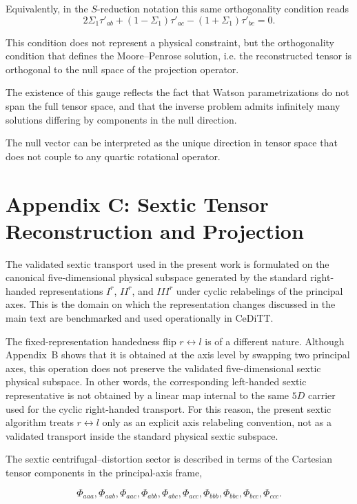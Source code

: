 \documentclass[aip,jcp,reprint,floatfix]{revtex4-2}
\begin{document}
Equivalently, in the $S$-reduction notation this same orthogonality
condition reads
\begin{equation}
2\Sigma_1\tau'_{ab}+(1-\Sigma_1)\tau'_{ac}-(1+\Sigma_1)\tau'_{bc}=0.
\end{equation}

This condition does not represent a physical constraint, but the
orthogonality condition that defines the Moore–Penrose solution,
i.e. the reconstructed tensor is orthogonal to the null space of the
projection operator.

The existence of this gauge reflects the fact that Watson
parametrizations do not span the full tensor space, and that the
inverse problem admits infinitely many solutions differing by
components in the null direction.

The null vector can be interpreted as the unique direction in tensor
space that does not couple to any quartic rotational operator.


\section{Appendix C: Sextic Tensor Reconstruction and Projection}

The validated sextic transport used in the present work is formulated
on the canonical five-dimensional physical subspace generated by the
standard right-handed representations $I^r$, $II^r$, and $III^r$ under
cyclic relabelings of the principal axes. This is the domain on which
the representation changes discussed in the main text are benchmarked
and used operationally in CeDiTT.

The fixed-representation handedness flip $r \leftrightarrow l$ is of a
different nature. Although Appendix~B shows that it is obtained at the
axis level by swapping two principal axes, this operation does not
preserve the validated five-dimensional sextic physical subspace. In
other words, the corresponding left-handed sextic representative is not
obtained by a linear map internal to the same $5D$ carrier used for the
cyclic right-handed transport. For this reason, the present sextic
algorithm treats $r \leftrightarrow l$ only as an explicit axis
relabeling convention, not as a validated transport inside the standard
physical sextic subspace.

The sextic centrifugal–distortion sector is described in terms of the
Cartesian tensor components in the principal-axis frame,

\[
\Phi_{aaa},\Phi_{aab},\Phi_{aac},\Phi_{abb},\Phi_{abc},\Phi_{acc},
\Phi_{bbb},\Phi_{bbc},\Phi_{bcc},\Phi_{ccc}.
\]
\end{document}
